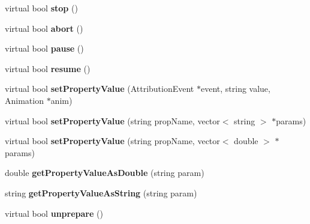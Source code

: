 \begin{CompactItemize}
\item 
virtual bool \textbf{stop} ()\label{classbr_1_1pucrio_1_1telemidia_1_1ginga_1_1ncl_1_1model_1_1components_1_1ExecutionObject_3d0f1501fa4ccfb9e3f868ab4a185856}

\item 
virtual bool \textbf{abort} ()\label{classbr_1_1pucrio_1_1telemidia_1_1ginga_1_1ncl_1_1model_1_1components_1_1ExecutionObject_fd9013d2c3c1e4507a6ba5bb5cdac9f6}

\item 
virtual bool \textbf{pause} ()\label{classbr_1_1pucrio_1_1telemidia_1_1ginga_1_1ncl_1_1model_1_1components_1_1ExecutionObject_1bb2a8fd099734a2a6d1cab9fbca1939}

\item 
virtual bool \textbf{resume} ()\label{classbr_1_1pucrio_1_1telemidia_1_1ginga_1_1ncl_1_1model_1_1components_1_1ExecutionObject_0c7b890cc1963471052f4d51db565f8a}

\item 
virtual bool \textbf{setPropertyValue} (AttributionEvent $\ast$event, string value, Animation $\ast$anim)\label{classbr_1_1pucrio_1_1telemidia_1_1ginga_1_1ncl_1_1model_1_1components_1_1ExecutionObject_5d79a10e2dd630bdc4d9c4823ea59287}

\item 
virtual bool \textbf{setPropertyValue} (string propName, vector$<$ string $>$ $\ast$params)\label{classbr_1_1pucrio_1_1telemidia_1_1ginga_1_1ncl_1_1model_1_1components_1_1ExecutionObject_fd7032e1de881aa8c050b26127ee0107}

\item 
virtual bool \textbf{setPropertyValue} (string propName, vector$<$ double $>$ $\ast$params)\label{classbr_1_1pucrio_1_1telemidia_1_1ginga_1_1ncl_1_1model_1_1components_1_1ExecutionObject_3af361827c518e7566df8b2560df898c}

\item 
double \textbf{getPropertyValueAsDouble} (string param)\label{classbr_1_1pucrio_1_1telemidia_1_1ginga_1_1ncl_1_1model_1_1components_1_1ExecutionObject_a8d2bb50f221375632a83bc69e00388e}

\item 
string \textbf{getPropertyValueAsString} (string param)\label{classbr_1_1pucrio_1_1telemidia_1_1ginga_1_1ncl_1_1model_1_1components_1_1ExecutionObject_954594bcf9dc24409f21846f365c540a}

\item 
virtual bool \textbf{unprepare} ()\label{classbr_1_1pucrio_1_1telemidia_1_1ginga_1_1ncl_1_1model_1_1components_1_1ExecutionObject_e7bf99c1347e02aa34a54ed2e1d00865}


\end{CompactItemize}
